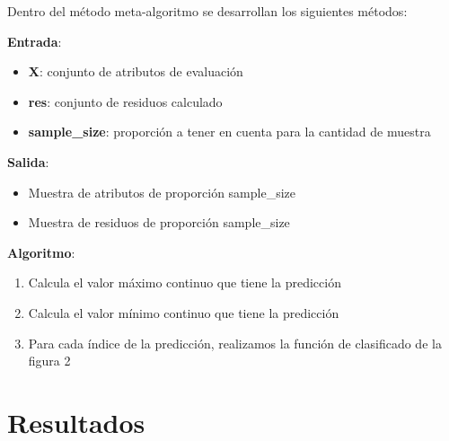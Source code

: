 \documentclass[conference,a4paper]{IEEEtran}
\begin{document}
Dentro del método meta-algoritmo se desarrollan los siguientes métodos:


\begin{textb}
    \textbf{Entrada}:
    \begin{itemize}
    \item \textbf{X}: conjunto de atributos de evaluación
    \item \textbf{res}: conjunto de residuos calculado
    \item \textbf{sample\_size}: proporción a tener en cuenta para la cantidad de muestra
\end{itemize}
\textbf{Salida}:
\begin{itemize}
    \item Muestra de atributos de proporción sample\_size
    \item Muestra de residuos de proporción sample\_size
\end{itemize}
\textbf{Algoritmo}:
\begin{enumerate}
    \item Calcula el valor máximo continuo que tiene la predicción
    \item Calcula el valor mínimo continuo que tiene la predicción
    \item Para cada índice de la predicción, realizamos la función de clasificado de la figura 2
\end{enumerate}
\end{textb}


\section{Resultados}
\end{document}
